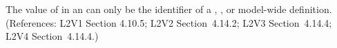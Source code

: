 The value of  in an \EventAssignment can only be the
identifier of a \Compartment, \Species, or model-wide \Parameter
definition.  (References: L2V1 Section 4.10.5; L2V2 Section~4.14.2;
L2V3 Section~4.14.4; L2V4 Section~4.14.4.)
